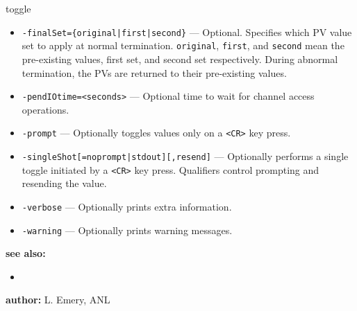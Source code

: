 \begin{sddsprog}{toggle}
\begin{itemize}
  \item {\tt -finalSet=\{original|first|second\}} --- Optional. Specifies which PV value set to apply at normal termination.
                 \verb+original+, \verb+first+, and \verb+second+ mean the pre-existing values, first set, and second set respectively.
                 During abnormal termination, the PVs are returned to their pre-existing values.
  \item {\tt -pendIOtime=<seconds>} --- Optional time to wait for channel access operations.
  \item {\tt -prompt} --- Optionally toggles values only on a \verb+<CR>+ key press.
  \item {\tt -singleShot[=noprompt|stdout][,resend]} --- Optionally performs a single toggle initiated by a \verb+<CR>+ key press. Qualifiers control prompting and resending the value.
  \item {\tt -verbose} --- Optionally prints extra information.
  \item {\tt -warning} --- Optionally prints warning messages.
\end{itemize}

\item \textbf{see also:}
\begin{itemize}
  \item {}
\end{itemize}
\item \textbf{author:} L. Emery, ANL
\end{sddsprog}
